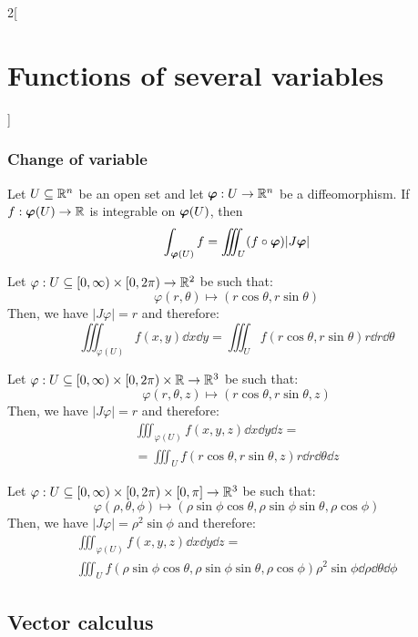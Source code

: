 \documentclass[../../../main.tex]{subfiles}
\begin{document}
\begin{multicols}{2}[\section{Functions of several variables}]
  \subsubsection{Change of variable}
  \begin{theorem}
    Let $U\subseteq\mathbb{R}^n$ be an open set and let $\boldsymbol{\mathrm{\varphi}}:U\rightarrow\mathbb{R}^n$ be a diffeomorphism. If $f:\boldsymbol{\mathrm{\varphi}}(U)\rightarrow\mathbb{R} $ is integrable on $\boldsymbol{\mathrm{\varphi}}(U)$, then $$\int_{\boldsymbol{\mathrm{\varphi}}(U)} f=\iiint_U(f\circ\boldsymbol{\mathrm{\varphi}})|J\boldsymbol{\mathrm{\varphi}}|$$
  \end{theorem}
  \begin{corollary}
    Let $\varphi:U\subseteq[0,\infty)\times[0,2\pi)\rightarrow\mathbb{R}^2 $ be such that:
    $$\varphi(r,\theta)\longmapsto(r\cos\theta,r\sin\theta)$$
    Then, we have $|J\varphi|=r$ and therefore: $$\iiint_{\varphi(U)}f(x,y)\dd{x}\dd{y}=\iiint_Uf(r\cos\theta,r\sin\theta)r\dd{r} \dd{\theta}$$
  \end{corollary}
  \begin{corollary}
    Let $\varphi:U\subseteq[0,\infty)\times[0,2\pi)\times\mathbb{R} \rightarrow\mathbb{R}^3 $ be such that: $$\varphi(r,\theta,z)\longmapsto(r\cos\theta,r\sin\theta,z)$$
    Then, we have $|J\varphi|=r$ and therefore:
    \begin{multline*}
      \iiint_{\varphi(U)}f(x,y,z)\dd{x}\dd{y}\dd{z}=\\=\iiint_Uf(r\cos\theta,r\sin\theta,z)r\dd{r} \dd{\theta} \dd{z}
    \end{multline*}
  \end{corollary}
  \begin{corollary}
    Let $\varphi:U\subseteq[0,\infty)\times[0,2\pi)\times[0,\pi]\rightarrow\mathbb{R}^3 $ be such that: $$\varphi(\rho,\theta,\phi)\longmapsto(\rho\sin\phi\cos\theta,\rho\sin\phi\sin\theta,\rho\cos\phi)$$
    Then, we have $|J\varphi|=\rho^2\sin\phi$ and therefore:
    \begin{multline*}
      \iiint_{\varphi(U)}f(x,y,z)\dd{x}\dd{y}\dd{z}=\\\iiint_Uf(\rho\sin\phi\cos\theta,\rho\sin\phi\sin\theta,\rho\cos\phi)\rho^2\sin\phi \dd{\rho} \dd{\theta} \dd{\phi}
    \end{multline*}
  \end{corollary}
  \subsection{Vector calculus}

\end{multicols}
\end{document}
